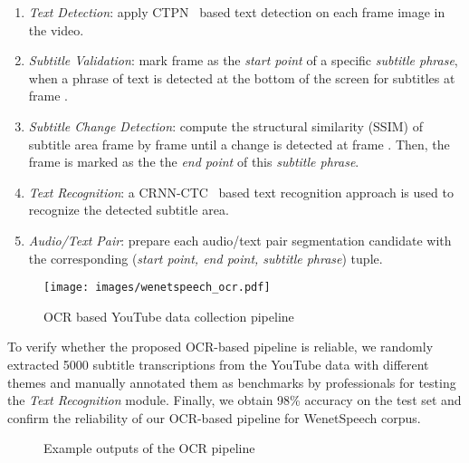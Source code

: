 \documentclass{article}
\begin{document}
\vspace{-0.5em}
\begin{enumerate}
    \setlength{\itemsep}{0pt}
    \item \textit{Text Detection}: apply CTPN~\cite{tian2016detecting} based text detection on each frame image in the video. 
    \item \textit{Subtitle Validation}: mark frame  as the \textit{start point} of a specific \textit{subtitle phrase}, when a phrase of text is detected at the bottom of the screen for subtitles at frame . 
    \item \textit{Subtitle Change Detection}: compute the structural similarity (SSIM) of subtitle area frame by frame until a change is detected at frame . Then, the frame  is marked as the the \textit{end point} of this \textit{subtitle phrase}.
    \item \textit{Text Recognition}: a CRNN-CTC~\cite{shi2016end} based text recognition approach is used to recognize the detected subtitle area.
    \item \textit{Audio/Text Pair}: prepare each audio/text pair segmentation candidate with the corresponding (\textit{start point, end point, subtitle phrase}) tuple.
\end{enumerate}
\begin{figure}[bh]
  \vspace{-1.5em}
  \centering
  \texttt{[image: images/wenetspeech\_ocr.pdf]}
  \vspace{-2em}
  \caption{OCR based YouTube data collection pipeline}
  \label{fig:ocr_pipeline}
  \vspace{-1em}
\end{figure}

To verify whether the proposed OCR-based pipeline is reliable,
we randomly extracted 5000 subtitle transcriptions from the YouTube data with different themes and manually annotated them as benchmarks by professionals for testing the \textit{Text Recognition} module.
Finally, we obtain 98\% accuracy on the test set and confirm the reliability of our OCR-based pipeline for WenetSpeech corpus.

\begin{figure}[th]
\centering
{}
\quad
{}
\quad
{}
\quad
{}
\vspace{-1em}
\caption{Example outputs of the OCR pipeline}
\label{fig:ocr_example}
\vspace{-2em}
\end{figure}
\end{document}
